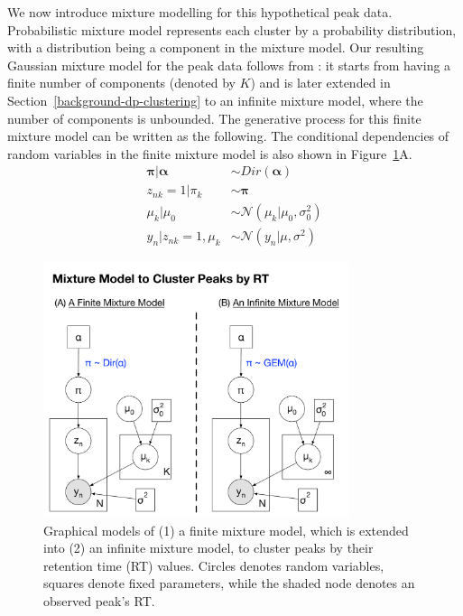 We now introduce mixture modelling for this hypothetical peak data. Probabilistic mixture model represents each cluster by a probability distribution, with a distribution being a component in the mixture model. Our resulting Gaussian mixture model for the peak data follows from \cite{Rasmussen2000}: it starts from having a finite number of components (denoted by $K$) and is later extended in Section~\ref{background-dp-clustering} to an infinite mixture model, where the number of components is unbounded. The generative process for this finite mixture model can be written as the following. The conditional dependencies of random variables in the finite mixture model is also shown in Figure~\ref{fig:background-mixture-plate-diagram}A. 
\begin{equation}
\begin{aligned}
\boldsymbol{\pi} \vert \boldsymbol{\alpha} &\sim Dir(\boldsymbol{\alpha}) \\
z_{nk}=1 \vert \pi_k                                  &\sim \boldsymbol{\pi} \\
\mu_k \vert \mu_0                                    &\sim \mathcal{N}(\mu_k \vert \mu_0, \sigma_0^2) \\
y_n \vert z_{nk}=1, \mu_k                         &\sim \mathcal{N}(y_n \vert \mu, \sigma^2)
\end{aligned}
\label{eq:background-finite-mixture}
\end{equation}

\begin{figure}[tbh!]
\noindent \begin{centering}
\includegraphics[width=0.8\textwidth]{03-machine-learning/figures/mixture_model.pdf}
\par\end{centering}
\caption[Graphical models of (1) a finite mixture model, which is extended into (2) an infinite mixture model, to cluster peaks by their retention time (RT) values.]{\label{fig:background-mixture-plate-diagram}Graphical models of (1) a finite mixture model, which is extended into (2) an infinite mixture model, to cluster peaks by their retention time (RT) values. Circles denotes random variables, squares denote fixed parameters, while the shaded node denotes an observed peak's RT.}
\end{figure}

